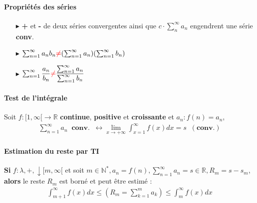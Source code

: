 \documentclass[2pt]{report}
\begin{document}
\begin{multicols*}{3}
\begin{itemize}
    \end{itemize}



    \paragraph{Propriétés des séries}
    \begin{itemize}
        \item[$\blacktriangleright$]  \textbf{+} et \textbf{-} de deux séries convergentes 
            ainsi que $c \cdot \sum_{n}^{\infty }a_n$ engendrent une série \textbf{conv}.
        \item[$\blacktriangleright$] 
            $\sum_{n=1}^{\infty}a_nb_n \textcolor{red}{\neq} 
            (\sum_{n=1}^{\infty}a_n)(\sum_{n=1}^{\infty}b_n)$
        \item[$\blacktriangleright$]
            $\sum_{n=1}^{\infty }\dfrac{a_n}{b_n} 
            \textcolor{red}{\neq} 
            \dfrac{\sum_{n=1}^{\infty}a_n}{\sum_{n=1}^{\infty}b_n}$
    \end{itemize}
    
    
    \paragraph{Test de l'intégrale}
    Soit $f : [1, \infty [ \rightarrow \mathbb{R}$ 
    \textbf{continue}, \textbf{positive} et \textbf{croissante} 
    et $a_n : f(n) = a_n$,
    \begin{align*}
        \sum_{n=1}^{\infty }a_n \;\; \textbf{conv.} \;\; \leftrightarrow
        \lim\limits_{x\to+\infty}\int_{x=1}^{\infty}f(x)dx = s \;\; (\textbf{conv.})    
    \end{align*}


    
    \paragraph{Estimation du reste par TI}
    \textbf{Si} $f: \lambda, + , \downarrow [m, \infty [$ et soit $m \in \mathbb{N}^*, 
     a_n = f(n), \sum_{n=1}^{\infty}a_n = s \in \mathbb{R}, 
     R_m = s - s_m$, \textbf{alors} le reste $R_m$ est borné et peut être 
     estimé :
     \begin{align*}
        \int_{m+1}^{\infty }f(x)dx \leq \left(R_m = \sum_{k=1}^{m} a_k\right) 
        \leq \int_{m}^{\infty }f(x)dx
     \end{align*}



\end{multicols*}
\end{document}
